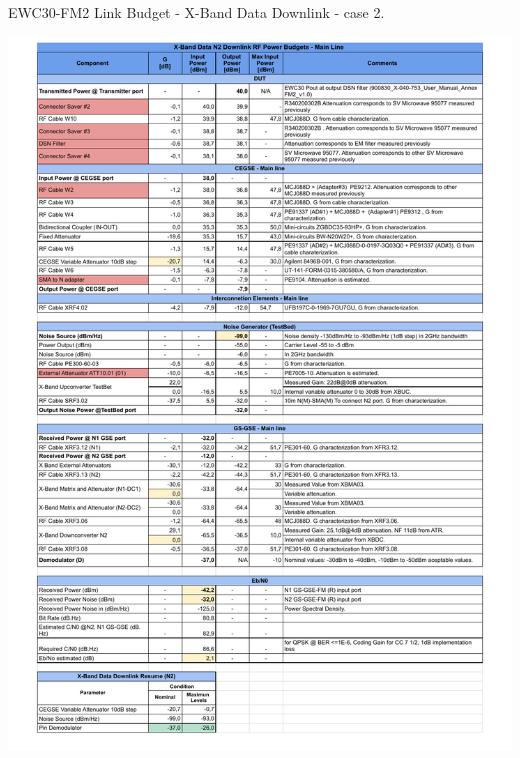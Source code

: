 \begin{table}[H]
	\centering
	\caption{EWC30-FM2 Link Budget - X-Band Data Downlink - case 2.} \label{tb:Data_EBN0FM2}
	\includegraphics[page=1, scale=0.75, trim=0cm 0cm 0cm 0cm, clip ]
	{tables/Ensayos COMM-SS Link Budget -EBN0 X-Band Data N2 Downlink.pdf}\\
\end{table}

